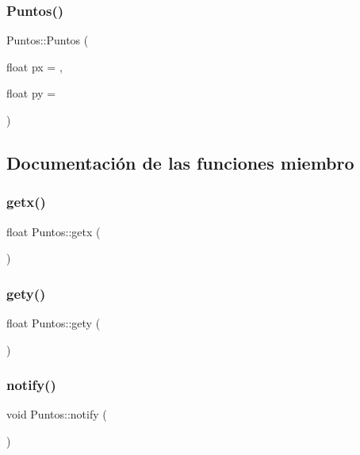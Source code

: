 \subsubsection{\texorpdfstring{Puntos()}{Puntos()}}
{\footnotesize\ttfamily Puntos\+::\+Puntos (\begin{DoxyParamCaption}\item[{float}]{px = {},  }\item[{float}]{py = {} }\end{DoxyParamCaption})\hspace{0.3cm}{\ttfamily [inline]}}



\subsection{Documentación de las funciones miembro}
\mbox{\label{class_puntos_a28373f6fd5024a32aedee640c39f23e9}} 
\subsubsection{\texorpdfstring{getx()}{getx()}}
{\footnotesize\ttfamily float Puntos\+::getx (\begin{DoxyParamCaption}{ }\end{DoxyParamCaption})\hspace{0.3cm}{\ttfamily [inline]}}

\mbox{\label{class_puntos_a2a51db64fb37a5785705742ffe4e4c39}} 
\subsubsection{\texorpdfstring{gety()}{gety()}}
{\footnotesize\ttfamily float Puntos\+::gety (\begin{DoxyParamCaption}{ }\end{DoxyParamCaption})\hspace{0.3cm}{\ttfamily [inline]}}

\mbox{\label{class_puntos_a932a43997f32e52b8bfdc0fe17f92931}} 
\subsubsection{\texorpdfstring{notify()}{notify()}}
{\footnotesize\ttfamily void Puntos\+::notify (\begin{DoxyParamCaption}{ }\end{DoxyParamCaption})}

